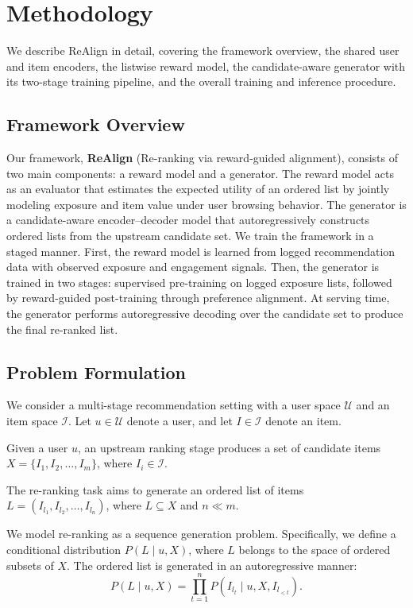\documentclass[sigconf]{acmart}
\begin{document}
\section{Methodology}
We describe ReAlign in detail, covering the framework overview, the shared user and item encoders, the listwise reward model, the candidate-aware generator with its two-stage training pipeline, and the overall training and inference procedure.

\subsection{Framework Overview}

Our framework, \textbf{ReAlign} (Re-ranking via reward-guided alignment), consists of two main components: a reward model and a generator. The reward model acts as an evaluator that estimates the expected utility of an ordered list by jointly modeling exposure and item value under user browsing behavior. The generator is a candidate-aware encoder--decoder model that autoregressively constructs ordered lists from the upstream candidate set. We train the framework in a staged manner. First, the reward model is learned from logged recommendation data with observed exposure and engagement signals. Then, the generator is trained in two stages: supervised pre-training on logged exposure lists, followed by reward-guided post-training through preference alignment. At serving time, the generator performs autoregressive decoding over the candidate set to produce the final re-ranked list.

\subsection{Problem Formulation}
We consider a multi-stage recommendation setting with a user space $\mathcal{U}$ and an item space $\mathcal{I}$.  
Let $u \in \mathcal{U}$ denote a user, and let $I \in \mathcal{I}$ denote an item.

Given a user $u$, an upstream ranking stage produces a set of candidate items $X = \{ I_1, I_2, \dots, I_m \}$, where $I_i \in \mathcal{I}$.

The re-ranking task aims to generate an ordered list of items $L = ( I_{l_1}, I_{l_2}, \dots, I_{l_n} )$, where $L \subseteq X$ and $n \ll m$.

We model re-ranking as a sequence generation problem. Specifically, we define a conditional distribution $P(L \mid u, X)$, where $L$ belongs to the space of ordered subsets of $X$. The ordered list is generated in an autoregressive manner:
\begin{equation}
P(L \mid u, X) = \prod_{t=1}^{n} P(I_{l_t} \mid u, X, I_{l_{<t}}).
\end{equation}
\end{document}
